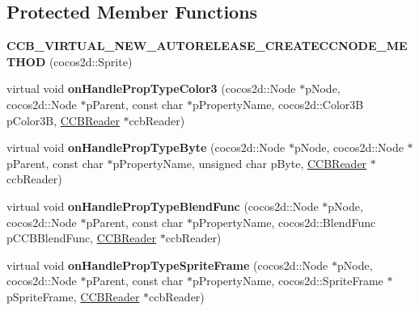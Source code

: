 \subsection*{Protected Member Functions}
\begin{DoxyCompactItemize}
\item 
\mbox{\label{classcocosbuilder_1_1SpriteLoader_ac61c91ba9165bf9e9d8a9a86bd315f0f}} 
{\bfseries C\+C\+B\+\_\+\+V\+I\+R\+T\+U\+A\+L\+\_\+\+N\+E\+W\+\_\+\+A\+U\+T\+O\+R\+E\+L\+E\+A\+S\+E\+\_\+\+C\+R\+E\+A\+T\+E\+C\+C\+N\+O\+D\+E\+\_\+\+M\+E\+T\+H\+OD} (cocos2d\+::\+Sprite)
\item 
\mbox{\label{classcocosbuilder_1_1SpriteLoader_a3a45af101a0db008f2d24dcf6b6ee66c}} 
virtual void {\bfseries on\+Handle\+Prop\+Type\+Color3} (cocos2d\+::\+Node $\ast$p\+Node, cocos2d\+::\+Node $\ast$p\+Parent, const char $\ast$p\+Property\+Name, cocos2d\+::\+Color3B p\+Color3B, \hyperlink{classcocosbuilder_1_1CCBReader}{C\+C\+B\+Reader} $\ast$ccb\+Reader)
\item 
\mbox{\label{classcocosbuilder_1_1SpriteLoader_a25f1e813e24637a4a741831ff6145869}} 
virtual void {\bfseries on\+Handle\+Prop\+Type\+Byte} (cocos2d\+::\+Node $\ast$p\+Node, cocos2d\+::\+Node $\ast$p\+Parent, const char $\ast$p\+Property\+Name, unsigned char p\+Byte, \hyperlink{classcocosbuilder_1_1CCBReader}{C\+C\+B\+Reader} $\ast$ccb\+Reader)
\item 
\mbox{\label{classcocosbuilder_1_1SpriteLoader_a3c6dea939a655ee315041aff1fe14ac6}} 
virtual void {\bfseries on\+Handle\+Prop\+Type\+Blend\+Func} (cocos2d\+::\+Node $\ast$p\+Node, cocos2d\+::\+Node $\ast$p\+Parent, const char $\ast$p\+Property\+Name, cocos2d\+::\+Blend\+Func p\+C\+C\+B\+Blend\+Func, \hyperlink{classcocosbuilder_1_1CCBReader}{C\+C\+B\+Reader} $\ast$ccb\+Reader)
\item 
\mbox{\label{classcocosbuilder_1_1SpriteLoader_af058cce49823dfc2482249ae42651670}} 
virtual void {\bfseries on\+Handle\+Prop\+Type\+Sprite\+Frame} (cocos2d\+::\+Node $\ast$p\+Node, cocos2d\+::\+Node $\ast$p\+Parent, const char $\ast$p\+Property\+Name, cocos2d\+::\+Sprite\+Frame $\ast$p\+Sprite\+Frame, \hyperlink{classcocosbuilder_1_1CCBReader}{C\+C\+B\+Reader} $\ast$ccb\+Reader)

\end{DoxyCompactItemize}
